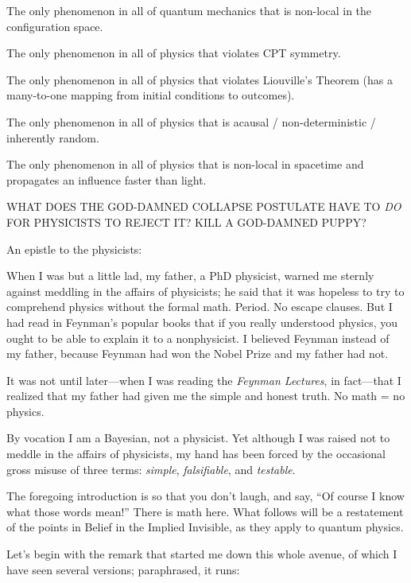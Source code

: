 {
 The only phenomenon in all of quantum mechanics that is non-local
in the configuration space.}

{
 The only phenomenon in all of physics that violates CPT symmetry.}

{
 The only phenomenon in all of physics that violates
Liouville's Theorem (has a many-to-one mapping from
initial conditions to outcomes).}

{
 The only phenomenon in all of physics that is acausal /
non-deterministic / inherently random.}

{
 The only phenomenon in all of physics that is non-local in
spacetime and propagates an influence faster than light.}

{
 WHAT DOES THE GOD-DAMNED COLLAPSE POSTULATE HAVE TO \textit{DO}
FOR PHYSICISTS TO REJECT IT? KILL A GOD-DAMNED PUPPY?}

\myendsectiontext


{
 An epistle to the physicists: }

{
 When I was but a little lad, my father, a PhD physicist, warned me
sternly against meddling in the affairs of physicists; he said that it
was hopeless to try to comprehend physics without the formal math.
Period. No escape clauses. But I had read in Feynman's
popular books that if you really understood physics, you ought to be
able to explain it to a nonphysicist. I believed Feynman instead of my
father, because Feynman had won the Nobel Prize and my father had not.}

{
 It was not until later---when I was reading the \textit{Feynman
Lectures}, in fact---that I realized that my father had given me the
simple and honest truth. No math = no physics.}

{
 By vocation I am a Bayesian, not a physicist. Yet although I was
raised not to meddle in the affairs of physicists, my hand has been
forced by the occasional gross misuse of three terms: \textit{simple},
\textit{falsifiable}, and \textit{testable}.}

{
 The foregoing introduction is so that you don't
laugh, and say, ``Of course I know what those words
mean!'' There is math here. What follows will be a
restatement of the points in Belief in the Implied Invisible, as they
apply to quantum physics.}

{
 Let's begin with the remark that started me down
this whole avenue, of which I have seen several versions; paraphrased,
it runs:}

